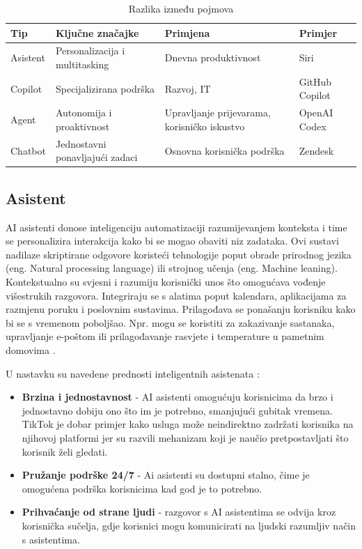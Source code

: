 \documentclass[]{foi}
\begin{document}
\begin{table}[h!]
\centering
\begin{tabularx}{\textwidth}{|l|X|X|X|}
\hline
\textbf{Tip}    & \textbf{Ključne značajke}         & \textbf{Primjena}                              & \textbf{Primjer}             \\
\hline
Asistent        & Personalizacija i multitasking    & Dnevna produktivnost                           & Siri         \\
\hline
Copilot         & Specijalizirana podrška           & Razvoj, IT                                     & GitHub Copilot                \\
\hline
Agent           & Autonomija i proaktivnost         & Upravljanje prijevarama, korisničko iskustvo   & OpenAI Codex                  \\
\hline
Chatbot         & Jednostavni ponavljajući zadaci   & Osnovna korisnička podrška                     & Zendesk                       \\
\hline
\end{tabularx}
\caption{Razlika između pojmova \cite{exomindset2025difference}}
\label{tab:chatbot_usporedba}
\end{table}
\newpage

\subsection{Asistent}

AI asistenti donose inteligenciju automatizaciji razumijevanjem konteksta i time se personalizira interakcija kako bi se mogao obaviti niz zadataka. Ovi sustavi nadilaze skriptirane odgovore
koristeći tehnologije poput obrade prirodnog jezika (eng. Natural processing language) ili strojnog učenja (eng. Machine leaning). Kontekstualno su svjesni i razumiju korisnički unos što omogućava
vođenje višestrukih razgovora. Integriraju se s alatima poput kalendara, aplikacijama za razmjenu poruku i poslovnim sustavima. Prilagođava se ponašanju korisniku kako bi se s vremenom poboljšao.
Npr. mogu se koristiti za zakazivanje sastanaka, upravljanje e-poštom ili prilagođavanje rasvjete i temperature u pametnim domovima \cite{exomindset2025difference}.

U nastavku su navedene prednosti inteligentnih asistenata \cite{buchan2024ai}:
\begin{itemize}
    \item \textbf{Brzina i jednostavnost} - AI asistenti omogućuju korisnicima da brzo i jednostavno dobiju ono što im je potrebno, smanjujući
    gubitak vremena. TikTok je dobar primjer kako usluga može neindirektno zadržati korisnika na njihovoj platformi jer su razvili mehanizam koji
    je naučio pretpostavljati što korisnik želi gledati.
    \item \textbf{Pružanje podrške 24/7} - Ai asistenti su dostupni stalno, čime je omogućena podrška korisnicima kad god je to potrebno. 
    \item \textbf{Prihvaćanje od strane ljudi} - razgovor s AI asistentima se odvija kroz korisnička sučelja, gdje korisnici mogu
    komunicirati na ljudski razumljiv način s asistentima. 
\end{itemize}
\end{document}
